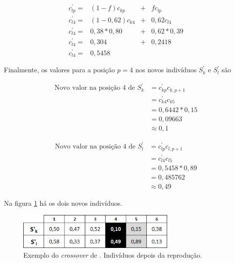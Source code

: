 \begin{equation}\label{eq:cl4}
	\begin{array}{lccl}
		c^{'}_{lp} = & (1-f) c_{kp} & + & f c_{lp} 						\\
		c^{'}_{l4} = & (1-0,62) c_{k4} & + & 0,62 c_{l4} 						\\
		c^{'}_{l4} = & 0,38 * 0,80 & + & 0,62 * 0,39 						\\
		c^{'}_{l4} = & 0,304 & + & 0,2418 						\\
		c^{'}_{l4} = & 0,5458 &  & 
	\end{array}
\end{equation}

Finalmente, os valores para a posição $p = 4$ nos novos indivíduos $S^{'}_k$ e $S^{'}_l$ são

\begin{equation}\label{eq:cross2004_novo_valor_sk}
	\begin{array}{ll}
	\mbox{Novo valor na posição 4 de  } S^{'}_k & = c^{'}_{kp} c_{k,p+1} \\
								& = c^{'}_{k4} c_{k5} \\
								& = 0,6442 * 0,15	\\
								& = 0,09663	\\
								& \approx 0,1
	\end{array}
\end{equation}

\begin{equation}\label{eq:cross2004_novo_valor_sl}
	\begin{array}{ll}
	\mbox{Novo valor na posição 4 de  } S^{'}_l & = c^{'}_{lp} c_{l,p+1} \\
								& = c^{'}_{l4} c_{l5} \\
								& = 0,5458 * 0,89	\\
								& = 0,485762 \\
								& \approx  0,49
	\end{array}
\end{equation}


Na figura \ref{fig:cross2004_tabelaDepois} há os dois novos indivíduos.

\begin{figure}[htbp]
	\centering
		\includegraphics[width=0.70\textwidth]{figs/materiais_metodo/autovalores_com_ga/cross2004_tabelaDepois.png}
	\caption{Exemplo do \emph{crossover} de \cite{metodo2004}. Indivíduos depois da reprodução.}
	\label{fig:cross2004_tabelaDepois}
\end{figure}

